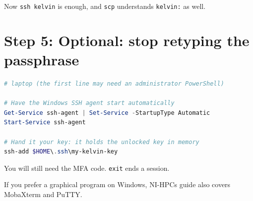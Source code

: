 Now \texttt{ssh\ kelvin} is enough, and \texttt{scp} understands \texttt{kelvin:} as well.

\section{Step 5: Optional: stop retyping the passphrase}\label{step-5-optional-stop-retyping-the-passphrase}

\begin{lstlisting}[language=powershell]
# laptop (the first line may need an administrator PowerShell)

# Have the Windows SSH agent start automatically
Get-Service ssh-agent | Set-Service -StartupType Automatic
Start-Service ssh-agent

# Hand it your key: it holds the unlocked key in memory
ssh-add $HOME\.ssh\my-kelvin-key
\end{lstlisting}

You will still need the MFA code. \texttt{exit} ends a session.

If you prefer a graphical program on Windows, NI-HPC\textquotesingle s guide also covers MobaXterm and PuTTY.

